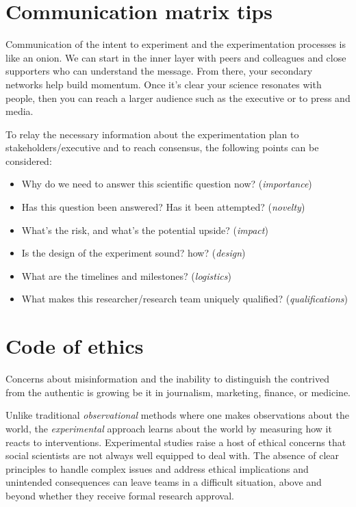 \documentclass[]{book}
\providecommand{\tightlist}{%
  \setlength{\itemsep}{0pt}\setlength{\parskip}{0pt}}
\begin{document}
\hypertarget{communication-matrix-tips}{%
\section{Communication matrix tips}\label{communication-matrix-tips}}

Communication of the intent to experiment and the experimentation processes is like an onion. We can start in the inner layer with peers and colleagues and close supporters who can understand the message. From there, your secondary networks help build momentum. Once it's clear your science resonates with people, then you can reach a larger audience such as the executive or to press and media.

To relay the necessary information about the experimentation plan to stakeholders/executive and to reach consensus, the following points can be considered:

\begin{itemize}
\tightlist
\item
  Why do we need to answer this scientific question now? (\emph{importance})
\item
  Has this question been answered? Has it been attempted? (\emph{novelty})
\item
  What's the risk, and what's the potential upside? (\emph{impact})
\item
  Is the design of the experiment sound? how? (\emph{design})
\item
  What are the timelines and milestones? (\emph{logistics})
\item
  What makes this researcher/research team uniquely qualified? (\emph{qualifications})
\end{itemize}

\hypertarget{code-of-ethics}{%
\section{Code of ethics}\label{code-of-ethics}}

Concerns about misinformation and the inability to distinguish the contrived from the authentic is growing be it in journalism, marketing, finance, or medicine.

Unlike traditional \emph{observational} methods where one makes observations about the world, the \emph{experimental} approach learns about the world by measuring how it reacts to interventions. Experimental studies raise a host of ethical concerns that social scientists are not always well equipped to deal with. The absence of clear principles to handle complex issues and address ethical implications and unintended consequences can leave teams in a difficult situation, above and beyond whether they receive formal research approval.
\end{document}
